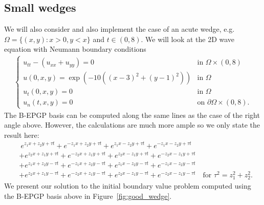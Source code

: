 \documentclass{article} %
\theoremstyle{plain}
\theoremstyle{definition}
\theoremstyle{remark}
\newcommand{\p}{\partial}
\begin{document}
\subsection{Small wedges}\label{sec:wedge_bad} 
We will also consider and also implement the case of an acute wedge, e.g. \(\Omega=\{(x,y):x>0,y<x\}\) and $t\in(0,8)$. We will look at the 2D wave equation with Neumann boundary conditions
\begin{align*}
    \begin{cases}
        u_{tt}-( u_{xx}+u_{yy})=0&\text{in }\Omega\times(0,8)\\
        u(0,x,y)= \exp (-10((x-3)^2+(y-1)^2))&\text{in }\Omega\\
        u_t(0,x,y) = 0&\text{in }\Omega\\
        u_n(t,x,y) = 0 &\text{on }  \p \Omega\times(0,8).
    \end{cases}
\end{align*}
The B-EPGP basis can be computed along the same lines as the case of the right angle above. However, the calculations are much more ample so we only state the result here:
\begin{align*}
    &\ e^{z_1x+z_2y+\tau t}+e^{-z_1x+z_2y+\tau t}+e^{z_1x-z_2y+\tau t}+e^{-z_1x-z_2y+\tau t}\\
    &+ e^{z_2x+z_1y+\tau t}+e^{-z_2x+z_1y+\tau t}+e^{z_2x-z_1y+\tau t}+e^{-z_2x-z_1y+\tau t}\\
    &+ e^{z_1x+z_2y-\tau t}+e^{-z_1x+z_2y-\tau t}+e^{z_1x-z_2y-\tau t}+e^{-z_1x-z_2y-\tau t}\\
    &+ e^{z_2x+z_1y-\tau t}+e^{-z_2x+z_1y-\tau t}+e^{z_2x-z_1y-\tau t}+e^{-z_2x-z_1y-\tau t}\quad\text{for }\tau^2=z_1^2+z_2^2.
\end{align*}
We present our solution to the initial boundary value problem computed using the B-EPGP basis above in Figure~\ref{fig:good_wedge}.
\end{document}
